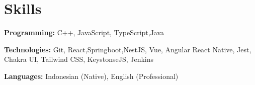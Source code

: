 \documentclass[letterpaper,11pt]{article}
\makeatletter
\newcommand{\resumeItem}[1]{
  \item\small{
    {#1 \vspace{-2pt}}
  }
}
\newcommand{\resumeProjectHeading}[2]{
    \item
    \begin{tabular*}{0.97\textwidth}{l@{\extracolsep{\fill}}r}
      \small#1 & #2 \\
    \end{tabular*}\vspace{-7pt}
}
\newcommand{\resumeSubHeadingListStart}{\begin{itemize}[leftmargin=0.15in, label={}]}
\newcommand{\resumeSubHeadingListEnd}{\end{itemize}}
\newcommand{\resumeItemListStart}{\begin{itemize}}
\newcommand{\resumeItemListEnd}{\end{itemize}\vspace{-5pt}}
\makeatother
\begin{document}
      




\section{Skills}
  \vspace{1pt}
  \resumeSubHeadingListStart
    \small{\item{
        \textbf{Programming:}{ C++, JavaScript, TypeScript,Java} \\ \vspace{2pt}
        
        \textbf{Technologies:}{ Git, React,Springboot,NestJS, Vue, Angular React Native, Jest, Chakra UI, Tailwind CSS, KeystonseJS, Jenkins} \\ \vspace{2pt}
        
        \textbf{Languages:}{ Indonesian (Native), English (Professional)}
        
    }}
  \resumeSubHeadingListEnd




    
\end{document}
